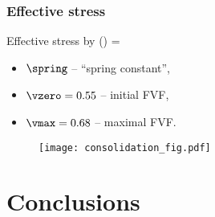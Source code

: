 \documentclass[compress]{beamer}%
\newenvironment{myalign}
{\align\color{\notcolor}}
{
  \nonumber
  \endalign
  \vspace{-1em}
}
\begin{document}
\begin{frame}
  \frametitle{Effective stress}

      Effective stress by \citet{Gutowski1987}
      \begin{myalign}
        \efstress(\vfrac) = \spring
      \end{myalign}
      \begin{itemize}
      \item $\spring$ -- ``spring constant'',
      \item $\vzero = 0.55$ -- initial FVF,
      \item $\vmax = 0.68$ -- maximal FVF.
      \end{itemize}

      \begin{figure}
  \centering
  \texttt{[image: consolidation\_fig.pdf]}
  \label{fig:consolidation}
\end{figure}
\end{frame}

\section{Conclusions}
\end{document}
